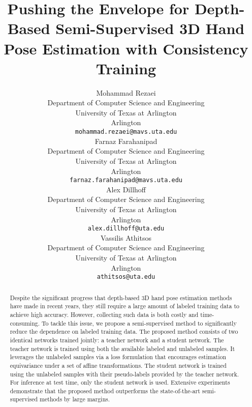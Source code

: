 \documentclass{article}
\title{Pushing the Envelope for Depth-Based Semi-Supervised 3D Hand Pose Estimation with Consistency Training}
\author{
  Mohammad Rezaei\\
  Department of Computer Science and Engineering \\
  University of Texas at Arlington \\
  Arlington\\
  \texttt{mohammad.rezaei@mavs.uta.edu} \\
\And
  Farnaz Farahanipad \\
  Department of Computer Science and Engineering \\
  University of Texas at Arlington \\
  Arlington\\
  \texttt{farnaz.farahanipad@mavs.uta.edu} \\
   \And
  Alex Dillhoff \\
  Department of Computer Science and Engineering \\
  University of Texas at Arlington \\
  Arlington\\
  \texttt{alex.dillhoff@uta.edu} \\
   \And
  Vassilis Athitsos \\
  Department of Computer Science and Engineering \\
  University of Texas at Arlington \\
  Arlington\\
  \texttt{athitsos@uta.edu} \\
}
\begin{document}
\maketitle


\begin{abstract}
Despite the significant progress that depth-based 3D hand pose estimation methods have made in  recent years, they still require a large amount of labeled training data to achieve high accuracy. However, collecting such data is both costly and time-consuming. To tackle this issue, we propose a semi-supervised method to significantly reduce the dependence on labeled training data. The proposed method consists of two identical networks trained jointly: a teacher network and a student network. The teacher network is trained using both the available labeled and unlabeled samples. It leverages the unlabeled samples via a loss formulation that encourages estimation equivariance under a set of affine transformations. The student network is trained using the unlabeled samples with their pseudo-labels provided by the teacher network. For inference at test time, only the student network is used. Extensive experiments demonstrate that the proposed method outperforms the state-of-the-art semi-supervised methods by large margins.
\end{abstract}


\end{document}
